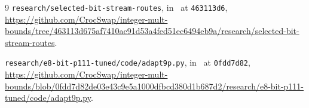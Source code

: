 \documentclass[11pt]{amsart}
\begin{document}
\begin{thebibliography}{9}
 \texttt{research/selected-bit-stream-routes}, in~\cite{CS} at \texttt{463113d6},
\url{https://github.com/CrocSwap/integer-mult-bounds/tree/463113d675af7410ac91d53a4fed51ec6494eb9a/research/selected-bit-stream-routes}.

 \texttt{research/e8-bit-p111-tuned/code/adapt9p.py}, in~\cite{CS} at
\texttt{0fdd7d82},
\url{https://github.com/CrocSwap/integer-mult-bounds/blob/0fdd7d82de03e43c9e5a1000dfbcd380d1b687d2/research/e8-bit-p111-tuned/code/adapt9p.py}.

\end{thebibliography}
\end{document}
